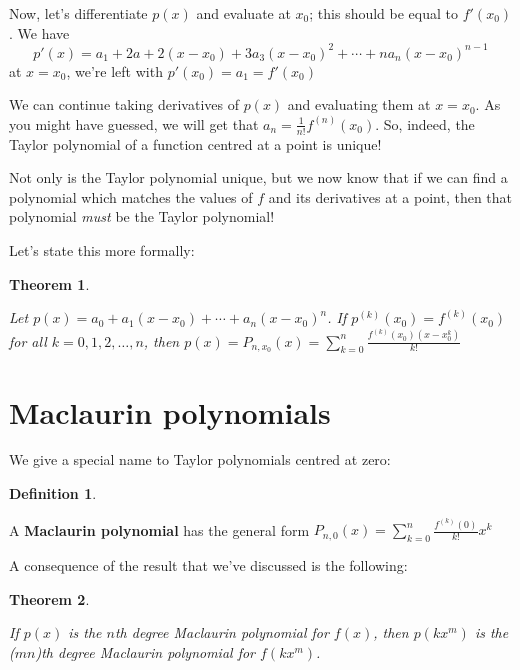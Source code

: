 \documentclass[
]{book}
\newtheorem{theorem}{Theorem}[chapter]
\theoremstyle{definition}
\newtheorem{definition}{Definition}[chapter]
\theoremstyle{definition}
\theoremstyle{definition}
\theoremstyle{definition}
\theoremstyle{remark}
\begin{document}
Now, let's differentiate \(p(x)\) and evaluate at \(x_0\); this should be equal to \(f'(x_0)\). We have \[p'(x)=a_1+2a+2(x-x_0)+3a_3(x-x_0)^2+\cdots + n a_n(x-x_0)^{n-1}\]
at \(x=x_0\), we're left with \(p'(x_0)=a_1 = f'(x_0)\)

We can continue taking derivatives of \(p(x)\) and evaluating them at \(x=x_0\). As you might have guessed, we will get that \(a_n=\frac{1}{n!}f^{(n)}(x_0)\). So, indeed, the Taylor polynomial of a function centred at a point is unique!

Not only is the Taylor polynomial unique, but we now know that if we can find a polynomial which matches the values of \(f\) and its derivatives at a point, then that polynomial \emph{must} be the Taylor polynomial!

Let's state this more formally:

\begin{theorem}
\protect\hypertarget{thm:unlabeled-div-154}{}\label{thm:unlabeled-div-154}

Let \(p(x)=a_0+a_1(x-x_0)+\cdots +a_n(x-x_0)^n\). If \(p^{(k)}(x_0)=f^{(k)}(x_0)\) for all \(k=0, 1, 2,\ldots, n\), then \(p(x)=P_{n, x_0}(x)= \sum_{k=0}^n \frac{f^{(k)}(x_0)(x-x_0^k)}{k!}\)

\end{theorem}

\hypertarget{maclaurin-polynomials}{%
\section{Maclaurin polynomials}\label{maclaurin-polynomials}}

We give a special name to Taylor polynomials centred at zero:

\begin{definition}
\protect\hypertarget{def:unlabeled-div-155}{}\label{def:unlabeled-div-155}

A \textbf{Maclaurin polynomial} has the general form \(P_{n,0}(x)=\sum_{k=0}^n\frac{f^{(k)}(0)}{k!}x^k\)

\end{definition}

A consequence of the result that we've discussed is the following:

\begin{theorem}
\protect\hypertarget{thm:unlabeled-div-156}{}\label{thm:unlabeled-div-156}

If \(p(x)\) is the \(n\)th degree Maclaurin polynomial for \(f(x)\), then \(p(k x^m)\) is the (\(mn\))th degree Maclaurin polynomial for \(f(kx^m)\).

\end{theorem}
\end{document}
